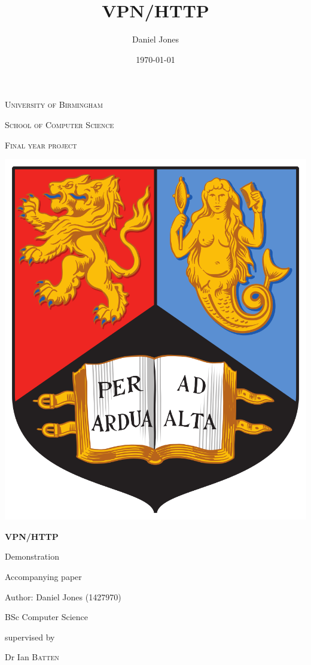 \documentclass[12pt]{article}
\title{VPN/HTTP}
\author{Daniel Jones}
\date{\today}
\begin{document}
\begin{titlepage}
	\centering
	\vspace{2cm}
	{\scshape\LARGE University of Birmingham \par}
	\vspace{1cm}
	{\scshape\Large School of Computer Science \par}
	{\scshape\Large Final year project\par}
	\vspace{1cm}
	\includegraphics[scale = 0.12]{images/uni-crest}
	\vfill
    {\huge\bfseries VPN/HTTP \par}
    {\Large Demonstration \par}
    Accompanying paper \par
	\vspace{2cm}
    {\Large{Author: Daniel Jones (1427970)} \par}
	\vspace{0.25cm}
    {\Large{BSc Computer Science} \par}
	\vfill
	supervised by\par
	Dr Ian \textsc{Batten}
	\vfill

	{\par}
\end{titlepage}
\end{document}
